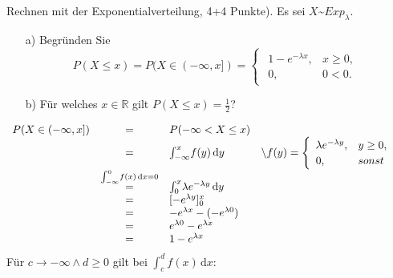 \documentclass[twoside]{article}
\begin{document}
Rechnen mit der Exponentialverteilung, 4+4 Punkte).
Es sei $X$\textasciitilde$Exp_{\lambda}$.
\begin{enumerate}
		\item[a)] Begründen Sie
			\[
				P(X \leq x)=P(X \in (-\infty, x])=\begin{cases}
														\begin{array}{ll}
															1-e^{-\lambda x},	& x \geq 0,\\
															0,					& 0 < 0.
														\end{array}
													\end{cases}
			\]
		\item[b)] Für welches $x \in \mathbb{R}$ gilt $P(X \leq x) = \frac{1}{2}$?
\end{enumerate}
\sss
    \begin{equation*}
        \begin{array}{rcll}
            P(X \in (-\infty, x]) &=& P(-\infty < X \leq x)&\\
            &=& \int_{-\infty}^{x} \! f(y) \, \mathrm{d}y &$\textbackslash$ f(y) = \begin{cases}
                                                                                                    \begin{array}{ll}
                                                                                                        \lambda e^{-\lambda y}, & y \geq 0,\\
                                                                                                        0, & sonst
                                                                                                    \end{array}
                                                                                                \end{cases}\\
            &\stackrel{\int_{-\infty}^{0} \! f(x) \, \mathrm{d}x=0}{=}&\int_{0}^{x} \! \lambda e^{-\lambda y} \, \mathrm{d}y&\\
            &=&[-e^{\lambda y}]_0^x&\\
            &=&-e^{\lambda x} - (-e^{\lambda 0})&\\
            &=&e^{\lambda 0} -e^{\lambda x}&\\
            &=&1-e^{\lambda x}
        \end{array}
    \end{equation*}
        Für $c \rightarrow -\infty \land d \geq 0$ gilt bei $\int_c^d \! f(x) \, \mathrm{d}x$:
\end{document}
